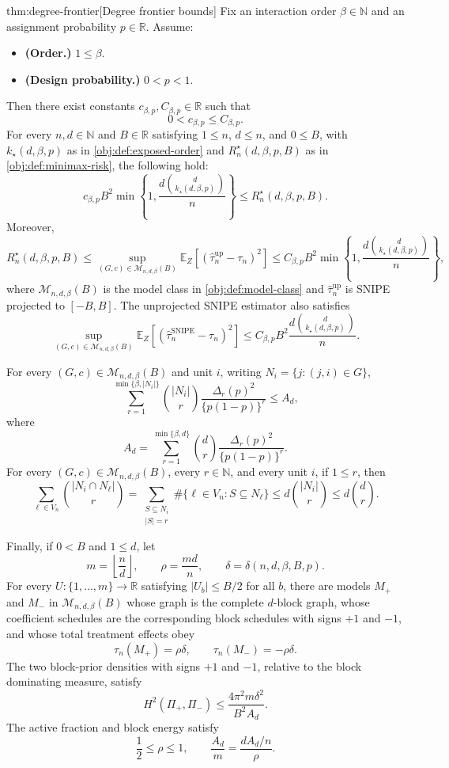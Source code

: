 \documentclass[11pt]{article}
\begin{document}
\begin{theoremv}{thm:degree-frontier}[Degree frontier bounds]
Fix an interaction order \(\beta\in\mathbb N\) and an assignment probability \(p\in\mathbb R\). Assume:
\begin{itemize}
\item \textbf{(Order.)} \(1\le \beta\).
\item \textbf{(Design probability.)} \(0<p<1\).
\end{itemize}
Then there exist constants \(c_{\beta,p},C_{\beta,p}\in\mathbb R\) such that
\[
0<c_{\beta,p}\le C_{\beta,p}.
\]
For every \(n,d\in\mathbb N\) and \(B\in\mathbb R\) satisfying \(1\le n\), \(d\le n\), and \(0\le B\), with \(k_\star(d,\beta,p)\) as in \cref{obj:def:exposed-order} and \(R_n^\star(d,\beta,p,B)\) as in \cref{obj:def:minimax-risk}, the following hold:
\[
c_{\beta,p}B^2
\min\!\left\{1,\frac{d\binom{d}{k_\star(d,\beta,p)}}{n}\right\}
\le
R_n^\star(d,\beta,p,B).
\]
Moreover,
\[
R_n^\star(d,\beta,p,B)
\le
\sup_{(G,c)\in\mathcal M_{n,d,\beta}(B)}
\mathbb E_Z\!\left[
\left(\widehat\tau_n^{\mathrm{up}}-\tau_n\right)^2
\right]
\le
C_{\beta,p}B^2
\min\!\left\{1,\frac{d\binom{d}{k_\star(d,\beta,p)}}{n}\right\},
\]
where \(\mathcal M_{n,d,\beta}(B)\) is the model class in \cref{obj:def:model-class} and \(\widehat\tau_n^{\mathrm{up}}\) is SNIPE projected to \([-B,B]\). The unprojected SNIPE estimator also satisfies
\[
\sup_{(G,c)\in\mathcal M_{n,d,\beta}(B)}
\mathbb E_Z\!\left[
\left(\widehat\tau_n^{\mathrm{SNIPE}}-\tau_n\right)^2
\right]
\le
C_{\beta,p}B^2
\frac{d\binom{d}{k_\star(d,\beta,p)}}{n}.
\]

For every \((G,c)\in\mathcal M_{n,d,\beta}(B)\) and unit \(i\), writing \(N_i=\{j:(j,i)\in G\}\),
\[
\sum_{r=1}^{\min\{\beta,|N_i|\}}
\binom{|N_i|}{r}
\frac{\Delta_r(p)^2}{\{p(1-p)\}^r}
\le
A_d,
\]
where
\[
A_d
=
\sum_{r=1}^{\min\{\beta,d\}}
\binom{d}{r}
\frac{\Delta_r(p)^2}{\{p(1-p)\}^r}.
\]
For every \((G,c)\in\mathcal M_{n,d,\beta}(B)\), every \(r\in\mathbb N\), and every unit \(i\), if \(1\le r\), then
\[
\sum_{\ell\in V_n}
\binom{|N_i\cap N_\ell|}{r}
=
\sum_{\substack{S\subseteq N_i\\ |S|=r}}
\#\{\ell\in V_n:S\subseteq N_\ell\}
\le
d\binom{|N_i|}{r}
\le
d\binom{d}{r}.
\]

Finally, if \(0<B\) and \(1\le d\), let
\[
m=\left\lfloor\frac{n}{d}\right\rfloor,
\qquad
\rho=\frac{md}{n},
\qquad
\delta=\delta(n,d,\beta,B,p).
\]
For every \(U:\{1,\ldots,m\}\to\mathbb R\) satisfying \(|U_b|\le B/2\) for all \(b\), there are models \(M_+\) and \(M_-\) in \(\mathcal M_{n,d,\beta}(B)\) whose graph is the complete \(d\)-block graph, whose coefficient schedules are the corresponding block schedules with signs \(+1\) and \(-1\), and whose total treatment effects obey
\[
\tau_n(M_+)=\rho\delta,
\qquad
\tau_n(M_-)=-\rho\delta.
\]
The two block-prior densities with signs \(+1\) and \(-1\), relative to the block dominating measure, satisfy
\[
H^2(\Pi_+,\Pi_-)
\le
\frac{4\pi^2m\delta^2}{B^2A_d}.
\]
The active fraction and block energy satisfy
\[
\frac12\le \rho\le 1,
\qquad
\frac{A_d}{m}
=
\frac{dA_d/n}{\rho}.
\]
\end{theoremv}
\end{document}
